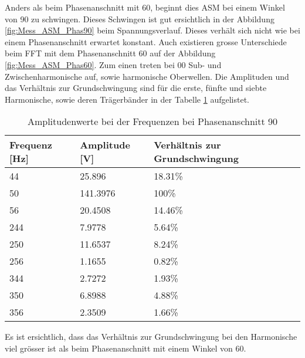 Anders als beim Phasenanschnitt mit 60\textdegree, beginnt dies ASM bei einem Winkel von 90\textdegree \hspace{0.02cm} zu schwingen. Dieses Schwingen ist gut ersichtlich in der Abbildung \ref{fig:Mess_ASM_Phas90} beim Spannungsverlauf. Dieses verhält sich nicht wie bei einem Phasenanschnitt erwartet konstant. Auch existieren grosse Unterschiede beim FFT mit dem Phasenanschnitt 60\textdegree \hspace{0.02cm} auf der Abbildung \ref{fig:Mess_ASM_Phas60}. Zum einen treten bei 00\textdegree \hspace{0.02cm} Sub- und Zwischenharmonische auf, sowie harmonische Oberwellen. Die Amplituden und das Verhältnis zur Grundschwingung sind für die erste, fünfte und siebte Harmonische, sowie deren Trägerbänder in der Tabelle \ref{tab:Mess_Spannung_ASM_Phas90} aufgelistet. 
\newpage
\begin{table}[ht!]
	\centering
	\begin{tabular}{|l|l|l|}
		\hline
		Frequenz {[}Hz{]} & Amplitude {[}V{]} & Verhältnis zur Grundschwingung \\ \hline
		44                & 25.896            & 18.31\%                        \\ \hline
		50                & 141.3976          & 100\%                          \\ \hline
		56                & 20.4508           & 14.46\%                        \\ \hline
		244               & 7.9778            & 5.64\%                         \\ \hline
		250               & 11.6537           & 8.24\%                         \\ \hline
		256               & 1.1655            & 0.82\%                         \\ \hline
		344               & 2.7272            & 1.93\%                         \\ \hline
		350               & 6.8988            & 4.88\%                         \\ \hline
		356               & 2.3509            & 1.66\%                         \\ \hline
	\end{tabular}
\caption{Amplitudenwerte bei der Frequenzen bei Phasenanschnitt 90\textdegree}\label{tab:Mess_Spannung_ASM_Phas90}
\end{table}

Es ist ersichtlich, dass das Verhältnis zur Grundschwingung bei den Harmonische viel grösser ist als beim Phasenanschnitt mit einem Winkel von 60\textdegree. 

